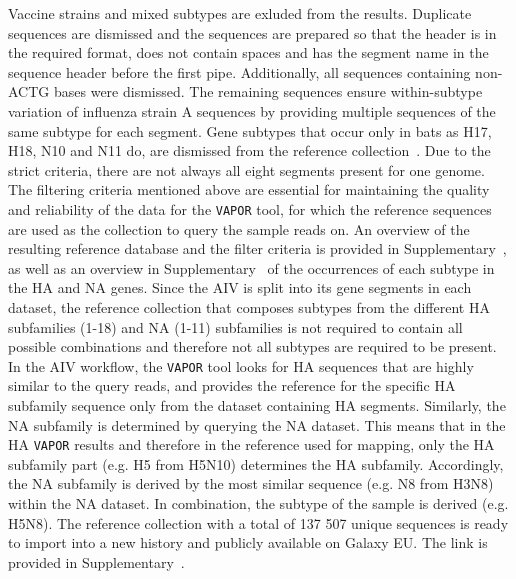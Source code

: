 Vaccine strains and mixed subtypes are exluded from the results. Duplicate sequences are dismissed and the sequences are prepared so that the header is in the required format, does not contain spaces and has the segment name in the sequence header before the first pipe. Additionally, all sequences containing non-ACTG bases were dismissed. The remaining sequences ensure within-subtype variation of influenza strain A sequences by providing multiple sequences of the same subtype for each segment. Gene subtypes that occur only in bats as H17, H18, N10 and N11 do, are dismissed from the reference collection~\cite{tong2013new}. Due to the strict criteria, there are not always all eight segments present for one genome. The filtering criteria mentioned above are essential for maintaining the quality and reliability of the data for the \texttt{VAPOR} tool, for which the reference sequences are used as the collection to query the sample reads on. An overview of the resulting reference database and the filter criteria is provided in Supplementary~, as well as an overview in Supplementary~ of the occurrences of each subtype in the \ac{HA} and \ac{NA} genes. Since the \ac{AIV} is split into its gene segments in each dataset, the reference collection that composes subtypes from the different \ac{HA} subfamilies (1-18) and \ac{NA} (1-11) subfamilies is not required to contain all possible combinations and therefore not all subtypes are required to be present. In the \ac{AIV} workflow, the \texttt{VAPOR} tool looks for \ac{HA} sequences that are highly similar to the query reads, and provides the reference for the specific \ac{HA} subfamily sequence only from the dataset containing \ac{HA} segments. Similarly, the \ac{NA} subfamily is determined by querying the \ac{NA} dataset. This means that in the \ac{HA} \texttt{VAPOR} results and therefore in the reference used for mapping, only the \ac{HA} subfamily part (e.g. H5 from H5N10) determines the \ac{HA} subfamily. Accordingly, the \ac{NA} subfamily is derived by the most similar sequence (e.g. N8 from H3N8) within the \ac{NA} dataset. In combination, the subtype of the sample is derived (e.g. H5N8).
The reference collection with a total of 137 507 unique sequences is ready to import into a new history and publicly available on Galaxy EU. The link is provided in Supplementary~. 

